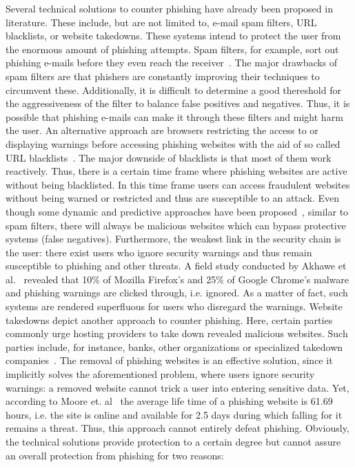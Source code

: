 Several technical solutions to counter phishing have already been proposed in literature.
These include, but are not limited to, e-mail spam filters, URL blacklists, or website takedowns.
These systems intend to protect the user from the enormous amount of phishing attempts. 
Spam filters, for example, sort out phishing e-mails before they even reach the receiver~\cite{bergholz2010new,chandrasekaran2006phishing,fette2007learning}.
The major drawbacks of spam filters are that phishers are constantly improving their techniques to circumvent these. Additionally, it is difficult to determine a good thereshold for the aggressiveness of the filter to balance false positives and negatives. 
Thus, it is possible that phishing e-mails can make it through these filters and might harm the user.
An alternative approach are browsers restricting the access to or displaying warnings before accessing phishing websites with the aid of so called URL blacklists~\cite{ma2009beyond, zhang2008highly}.
The major downside of blacklists is that most of them work reactively.
Thus, there is a certain time frame where phishing websites are active without being blacklisted.
In this time frame users can access fraudulent websites without being warned or restricted and thus are susceptible to an attack.
Even though some dynamic and predictive approaches have been proposed~\cite{prakash2010phishnet, obied2009fraudulent, balzarotti2012proactive}, similar to spam filters, there will always be malicious websites which can bypass protective systems (false negatives).
 Furthermore, the weakest link in the security chain is the user: there exist users who ignore security warnings and thus remain susceptible to phishing and other threats.
A field study conducted by Akhawe et al.~\cite{akhawe2013alice} revealed that 10\% of Mozilla Firefox's and 25\% of Google Chrome's malware and phishing warnings are clicked through, i.e. ignored.
 As a matter of fact, such systems are rendered superfluous for users who disregard the warnings.
Website takedowns depict another approach to counter phishing. Here, certain parties commonly urge hosting providers to take down revealed malicious websites.
Such parties include, for instance, banks, other organizations or specialized takedown companies~\cite{moore2007examining}.
 The removal of phishing websites is an effective solution, since it implicitly solves the aforementioned problem, where users ignore security warnings: a removed website cannot trick a user into entering sensitive data.
Yet, according to Moore et. al~\cite{moore2007examining} the average life time of a phishing website is 61.69 hours, i.e. the site is online and available for 2.5 days during which falling for it remains a threat.
Thus, this approach cannot entirely defeat phishing. 
Obviously, the technical solutions provide protection to a certain degree but cannot assure an overall protection from phishing for two reasons:

